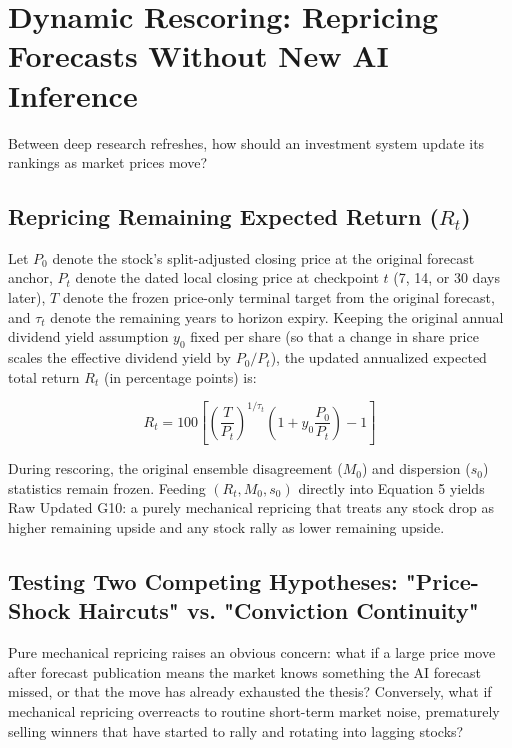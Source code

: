 \documentclass[11pt,a4paper]{article}
\numberwithin{table}{section}
\begin{document}


\section{Dynamic Rescoring: Repricing Forecasts Without New AI Inference}

Between deep research refreshes, how should an investment system update its rankings as market prices move?

\subsection{Repricing Remaining Expected Return ($R_t$)}

Let $P_0$ denote the stock's split-adjusted closing price at the original forecast anchor, $P_t$ denote the dated local closing price at checkpoint $t$ (7, 14, or 30 days later), $T$ denote the frozen price-only terminal target from the original forecast, and $\tau_t$ denote the remaining years to horizon expiry. Keeping the original annual dividend yield assumption $y_0$ fixed per share (so that a change in share price scales the effective dividend yield by $P_0 / P_t$), the updated annualized expected total return $R_t$ (in percentage points) is:

\begin{equation}R_t = 100\left[\left(\frac{T}{P_t}\right)^{1/\tau_t}\left(1 + y_0\frac{P_0}{P_t}\right) - 1\right] \end{equation}

During rescoring, the original ensemble disagreement ($M_0$) and dispersion ($s_0$) statistics remain frozen. Feeding $(R_t, M_0, s_0)$ directly into Equation 5 yields Raw Updated G10: a purely mechanical repricing that treats any stock drop as higher remaining upside and any stock rally as lower remaining upside.

\subsection{Testing Two Competing Hypotheses: "Price-Shock Haircuts" vs. "Conviction Continuity"}

Pure mechanical repricing raises an obvious concern: what if a large price move after forecast publication means the market knows something the AI forecast missed, or that the move has already exhausted the thesis? Conversely, what if mechanical repricing overreacts to routine short-term market noise, prematurely selling winners that have started to rally and rotating into lagging stocks?
\end{document}
